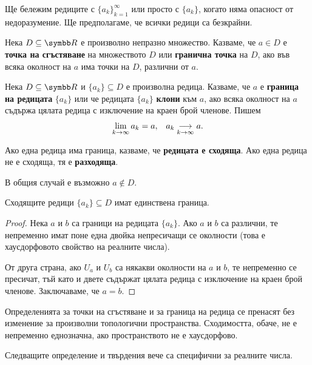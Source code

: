 \documentclass[numbers=endperiod, bibliography=totocnumbered]{scrartcl}
\begin{document}
Ще бележим редиците с \( {\{ a_k \}}_{k=1}^\infty \) или просто с \( \{ a_k \} \), когато няма опасност от недоразумение. Ще предполагаме, че всички редици са безкрайни.

\begin{definition}
  Нека \( D \subseteq \R \) е произволно непразно множество. Казваме, че \( a \in D \) е \textbf{точка на сгъстяване} на множеството \( D \) или \textbf{гранична точка} на \( D \), ако във всяка околност на \( a \) има точки на \( D \), различни от \( a \).
\end{definition}

\begin{definition}
  Нека \( D \subseteq \R \) и \( \{ a_k \} \subseteq D \) е произволна редица. Казваме, че \( a \) е \textbf{граница на редицата} \( \{ a_k \} \) или че редицата \( \{ a_k \} \) \textbf{клони} към \( a \), ако всяка околност на \( a \) съдържа цялата редица с изключение на краен брой членове. Пишем
  \begin{align*}
    \lim_{k \to \infty} a_k = a,
    &&
    a_k \Conv[k \to \infty]{} a.
  \end{align*}

  Ако една редица има граница, казваме, че \textbf{редицата е сходяща}. Ако една редица не е сходяща, тя е \textbf{разходяща}.
\end{definition}
\begin{remark}
  В общия случай е възможно \( a \not\in D \).
\end{remark}

\begin{proposition}
  Сходящите редици \( \{ a_k \} \subseteq D \) имат единствена граница.
\end{proposition}
\begin{proof}
  Нека \( a \) и \( b \) са граници на редицата \( \{ a_k \} \). Ако \( a \) и \( b \) са различни, те непременно имат поне една двойка непресичащи се околности (това е хаусдорфовото свойство на реалните числа).

  От друга страна, ако \( U_a \) и \( U_b \) са някакви околности на \( a \) и \( b \), те непременно се пресичат, тъй като и двете съдържат цялата редица с изключение на краен брой членове. Заключаваме, че \( a = b \).
\end{proof}

\begin{remark}
  Определенията за точки на сгъстяване и за граница на редица се пренасят без изменение за произволни топологични пространства. Сходимостта, обаче, не е непременно еднозначна, ако пространството не е хаусдорфово.

  Следващите определение и твърдения вече са специфични за реалните числа.
\end{remark}
\end{document}
